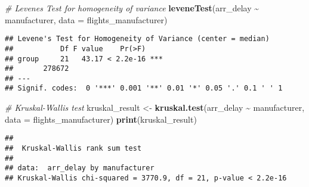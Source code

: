 \documentclass[
]{article}
\newenvironment{Shaded}{\begin{snugshade}}{\end{snugshade}}
\newcommand{\AttributeTok}[1]{\textcolor[rgb]{0.13,0.29,0.53}{#1}}
\newcommand{\CommentTok}[1]{\textcolor[rgb]{0.56,0.35,0.01}{\textit{#1}}}
\newcommand{\FunctionTok}[1]{\textcolor[rgb]{0.13,0.29,0.53}{\textbf{#1}}}
\newcommand{\NormalTok}[1]{#1}
\newcommand{\OtherTok}[1]{\textcolor[rgb]{0.56,0.35,0.01}{#1}}
\newcommand{\SpecialCharTok}[1]{\textcolor[rgb]{0.81,0.36,0.00}{\textbf{#1}}}
\begin{document}
\begin{Shaded}
\begin{Highlighting}[]
\CommentTok{\# Levene\textquotesingle{}s Test for homogeneity of variance}
\FunctionTok{leveneTest}\NormalTok{(arr\_delay }\SpecialCharTok{\textasciitilde{}}\NormalTok{ manufacturer, }\AttributeTok{data =}\NormalTok{ flights\_manufacturer)}
\end{Highlighting}
\end{Shaded}

\begin{verbatim}
## Levene's Test for Homogeneity of Variance (center = median)
##           Df F value    Pr(>F)    
## group     21   43.17 < 2.2e-16 ***
##       278672                      
## ---
## Signif. codes:  0 '***' 0.001 '**' 0.01 '*' 0.05 '.' 0.1 ' ' 1
\end{verbatim}

\begin{Shaded}
\begin{Highlighting}[]
\CommentTok{\# Kruskal{-}Wallis test }
\NormalTok{kruskal\_result }\OtherTok{\textless{}{-}} \FunctionTok{kruskal.test}\NormalTok{(arr\_delay }\SpecialCharTok{\textasciitilde{}}\NormalTok{ manufacturer, }\AttributeTok{data =}\NormalTok{ flights\_manufacturer)}
\FunctionTok{print}\NormalTok{(kruskal\_result)}
\end{Highlighting}
\end{Shaded}

\begin{verbatim}
## 
##  Kruskal-Wallis rank sum test
## 
## data:  arr_delay by manufacturer
## Kruskal-Wallis chi-squared = 3770.9, df = 21, p-value < 2.2e-16
\end{verbatim}
\end{document}
